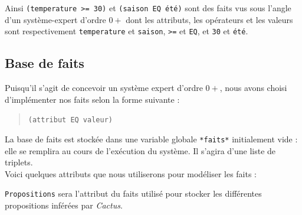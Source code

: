 \documentclass[a4paper,12pt]{article}
\begin{document}
	Ainsi \texttt{(temperature >= 30)} et \texttt{(saison EQ été)} sont des faits vus sous l'angle d'un système-expert d'ordre $0+$ dont les attributs, les opérateurs et les valeurs sont respectivement 	\texttt{temperature} et \texttt{saison}, \texttt{>=} et \texttt{EQ}, et \texttt{30} et \texttt{été}.

\subsection{Base de faits}

Puisqu'il s'agit de concevoir un système expert d'ordre $0+$, nous avons choisi d'implémenter nos faits selon la forme suivante :

\begin{quotation}
	\texttt{(attribut EQ valeur)}
\end{quotation}

La base de faits est stockée dans une variable globale \texttt{*faits*} initialement vide : elle se remplira au cours de l'exécution du système. Il s'agira d'une liste de triplets.\\

Voici quelques attributs que nous utiliserons pour modéliser les faits :

\begin{table}[H]
		\label{exempleAttributs}
		\caption{Exemple d'attributs pour les faits}
\end{table}

\texttt{Propositions} sera l'attribut du faits utilisé pour stocker les différentes propositions inférées par \textit{Cactus}.
\end{document}
